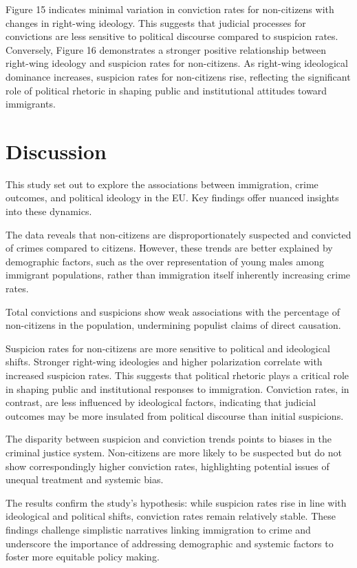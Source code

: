 \documentclass[
]{article}
\begin{document}
Figure 15 indicates minimal variation in conviction rates for
non-citizens with changes in right-wing ideology. This suggests that
judicial processes for convictions are less sensitive to political
discourse compared to suspicion rates. Conversely, Figure 16
demonstrates a stronger positive relationship between right-wing
ideology and suspicion rates for non-citizens. As right-wing ideological
dominance increases, suspicion rates for non-citizens rise, reflecting
the significant role of political rhetoric in shaping public and
institutional attitudes toward immigrants.

\section{Discussion}\label{discussion}

This study set out to explore the associations between immigration,
crime outcomes, and political ideology in the EU. Key findings offer
nuanced insights into these dynamics.

The data reveals that non-citizens are disproportionately suspected and
convicted of crimes compared to citizens. However, these trends are
better explained by demographic factors, such as the over representation
of young males among immigrant populations, rather than immigration
itself inherently increasing crime rates.

Total convictions and suspicions show weak associations with the
percentage of non-citizens in the population, undermining populist
claims of direct causation.

Suspicion rates for non-citizens are more sensitive to political and
ideological shifts. Stronger right-wing ideologies and higher
polarization correlate with increased suspicion rates. This suggests
that political rhetoric plays a critical role in shaping public and
institutional responses to immigration. Conviction rates, in contrast,
are less influenced by ideological factors, indicating that judicial
outcomes may be more insulated from political discourse than initial
suspicions.

The disparity between suspicion and conviction trends points to biases
in the criminal justice system. Non-citizens are more likely to be
suspected but do not show correspondingly higher conviction rates,
highlighting potential issues of unequal treatment and systemic bias.

The results confirm the study's hypothesis: while suspicion rates rise
in line with ideological and political shifts, conviction rates remain
relatively stable. These findings challenge simplistic narratives
linking immigration to crime and underscore the importance of addressing
demographic and systemic factors to foster more equitable policy making.
\end{document}
